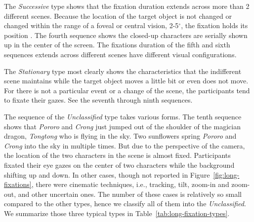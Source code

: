 \documentclass[oneside,master]{snueethesis}
\begin{document}
The \textit{Successive} type shows that the fixation duration extends across more than 2 different scenes. Because the location of the target object is not changed or changed within the range of a foveal or central vision, 2-5$^{\circ}$, the fixation holds its position \cite{mcmorris2014acquisition}. The fourth sequence shows the closed-up characters are serially shown up in the center of the screen. The fixations duration of the fifth and sixth sequences extends across different scenes have different visual configurations.

The \textit{Stationary} type most clearly shows the characteristics that the indifferent scene maintains while the target object moves a little bit or even does not move. For there is not a particular event or a change of the scene, the participants tend to fixate their gazes. See the seventh through ninth sequences.

The sequence of the \textit{Unclassified} type takes various forms. The tenth sequence shows that \textit{Pororo} and \textit{Crong} just jumped out of the shoulder of the magician dragon, \textit{Tongtong} who is flying in the sky. Two sunflowers spring \textit{Pororo} and \textit{Crong} into the sky in multiple times. But due to the perspective of the camera, the location of the two characters in the scene is almost fixed. Participants fixated their eye gazes on the center of two characters while the background shifting up and down. In other cases, though not reported in Figure~\ref{fig:long-fixations}, there were cinematic techniques, i.e., tracking, tilt, zoom-in and zoom-out, and other uncertain ones. The number of these cases is relatively so small compared to the other types, hence we classify all of them into the \textit{Unclassified}. We summarize those three typical types in Table~\ref{tab:long-fixation-types}.
\end{document}
